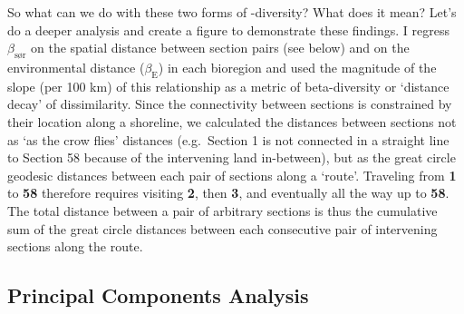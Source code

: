 \documentclass[10pt,a4,]{article}
\newenvironment{Shaded}{\begin{snugshade}}{\end{snugshade}}
\newcommand{\CommentTok}[1]{\textcolor[rgb]{0.56,0.35,0.01}{\textit{#1}}}
\newcommand{\DataTypeTok}[1]{\textcolor[rgb]{0.13,0.29,0.53}{#1}}
\newcommand{\KeywordTok}[1]{\textcolor[rgb]{0.13,0.29,0.53}{\textbf{#1}}}
\newcommand{\NormalTok}[1]{#1}
\newcommand{\OperatorTok}[1]{\textcolor[rgb]{0.81,0.36,0.00}{\textbf{#1}}}
\newcommand{\StringTok}[1]{\textcolor[rgb]{0.31,0.60,0.02}{#1}}
\begin{document}
So what can we do with these two forms of \textbeta-diversity? What does
it mean? Let's do a deeper analysis and create a figure to demonstrate
these findings. I regress \(\beta_{\text{sør}}\) on the spatial distance
between section pairs (see below) and on the environmental distance
(\(\beta_{\text{E}}\)) in each bioregion and used the magnitude of the
slope (per 100 km) of this relationship as a metric of beta-diversity or
`distance decay' of dissimilarity. Since the connectivity between
sections is constrained by their location along a shoreline, we
calculated the distances between sections not as `as the crow flies'
distances (e.g.~Section 1 is not connected in a straight line to Section
58 because of the intervening land in-between), but as the great circle
geodesic distances between each pair of sections along a `route'.
Traveling from \textbf{1} to \textbf{58} therefore requires visiting
\textbf{2}, then \textbf{3}, and eventually all the way up to
\textbf{58}. The total distance between a pair of arbitrary sections is
thus the cumulative sum of the great circle distances between each
consecutive pair of intervening sections along the route.

\begin{Shaded}
\end{Shaded}

\subsection{Principal Components Analysis}
\end{document}
